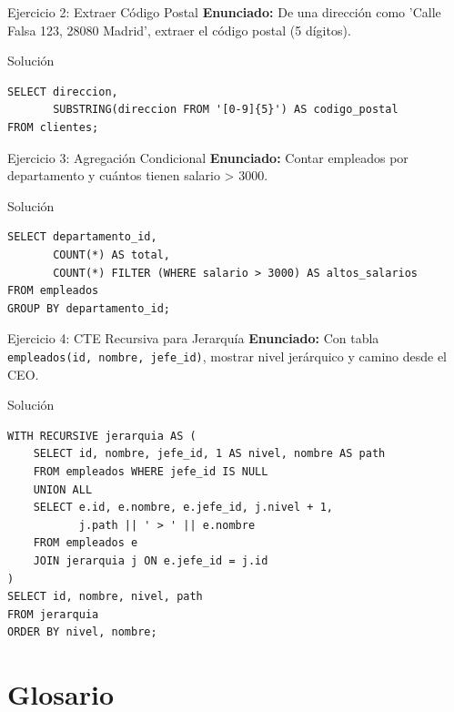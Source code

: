 \documentclass[aspectratio=169, 10pt, xcolor=table]{beamer}
\begin{document}
\begin{frame}[fragile]{Ejercicio 2: Extraer Código Postal}
    \textbf{Enunciado:} De una dirección como 'Calle Falsa 123, 28080 Madrid', extraer el código postal (5 dígitos).
    \begin{block}{Solución}
        \begin{lstlisting}
SELECT direccion,
       SUBSTRING(direccion FROM '[0-9]{5}') AS codigo_postal
FROM clientes;
        \end{lstlisting}
    \end{block}
\end{frame}

\begin{frame}[fragile]{Ejercicio 3: Agregación Condicional}
    \textbf{Enunciado:} Contar empleados por departamento y cuántos tienen salario > 3000.
    \begin{block}{Solución}
        \begin{lstlisting}
SELECT departamento_id,
       COUNT(*) AS total,
       COUNT(*) FILTER (WHERE salario > 3000) AS altos_salarios
FROM empleados
GROUP BY departamento_id;
        \end{lstlisting}
    \end{block}
\end{frame}

\begin{frame}[fragile]{Ejercicio 4: CTE Recursiva para Jerarquía}
    \textbf{Enunciado:} Con tabla \texttt{empleados(id, nombre, jefe\_id)}, mostrar nivel jerárquico y camino desde el CEO.
    \begin{block}{Solución}
        \begin{lstlisting}
WITH RECURSIVE jerarquia AS (
    SELECT id, nombre, jefe_id, 1 AS nivel, nombre AS path
    FROM empleados WHERE jefe_id IS NULL
    UNION ALL
    SELECT e.id, e.nombre, e.jefe_id, j.nivel + 1,
           j.path || ' > ' || e.nombre
    FROM empleados e
    JOIN jerarquia j ON e.jefe_id = j.id
)
SELECT id, nombre, nivel, path
FROM jerarquia
ORDER BY nivel, nombre;
        \end{lstlisting}
    \end{block}
\end{frame}

\section{Glosario}
\end{document}
